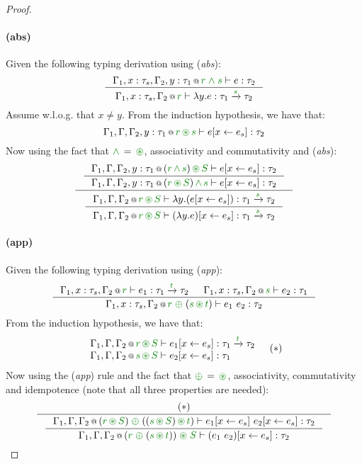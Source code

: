 \begin{proof}
\paragraph{(abs)} Given the following typing derivation using (\emph{abs}):
\[
\inference
  {\coctx{\Gamma_1,x:\tau_s,\Gamma_2, y:\tau_1}{\cclrd{r}\;\czip\;\cclrd{s}} \vdash e : \tau_2}
  {\coctx{\Gamma_1,x:\tau_s,\Gamma_2}{\cclrd{r}} \vdash \lambda y.e : \tau_1 \xrightarrow{\cclrd{s}} \tau_2 }
\]
Assume w.l.o.g. that $x\neq y$. From the induction hypothesis, we have that:
\[
\coctx{\Gamma_1,\Gamma,\Gamma_2, y:\tau_1}{ \cclrd{r} \,\cseq\, \cclrd{s} } \vdash \subst{e}{x}{e_s} : \tau_2
\]
Now using the fact that $\czip\,=\,\cseq$, associativity and commutativity and (\emph{abs}):
\[
\inference
 {\inference
  {\coctx{\Gamma_1,\Gamma,\Gamma_2, y:\tau_1}{ (\cclrd{r} \,\czip\, \cclrd{s})\,\cseq\,\cclrd{S} } \vdash \subst{e}{x}{e_s} : \tau_2}
  {\coctx{\Gamma_1,\Gamma,\Gamma_2, y:\tau_1}{ (\cclrd{r} \,\cseq\, \cclrd{S})\,\czip\,\cclrd{s} } \vdash \subst{e}{x}{e_s} : \tau_2}}
 {\inference
  {\coctx{\Gamma_1,\Gamma,\Gamma_2}{\cclrd{r} \,\cseq\, \cclrd{S}} \vdash \lambda y.(\subst{e}{x}{e_s}) : \tau_1 \xrightarrow{\cclrd{s}} \tau_2}
  {\coctx{\Gamma_1,\Gamma,\Gamma_2}{\cclrd{r} \,\cseq\, \cclrd{S}} \vdash \subst{(\lambda y.e)}{x}{e_s} : \tau_1 \xrightarrow{\cclrd{s}} \tau_2} }
\]

\paragraph{(app)} Given the following typing derivation using (\emph{app}):
\[
\inference
  {\coctx{\Gamma_1,x:\tau_s,\Gamma_2}{\cclrd{r}} \vdash e_1 : \tau_1 \xrightarrow{\cclrd{t}} \tau_2 &
   \coctx{\Gamma_1,x:\tau_s,\Gamma_2}{\cclrd{s}} \vdash e_2 : \tau_1 }
  {\coctx{\Gamma_1,x:\tau_s,\Gamma_2}{\cclrd{r} \;\cpar\; (\cclrd{s} \,\cseq\, \cclrd{t})} \vdash e_1~e_2 : \tau_2}
\]
From the induction hypothesis, we have that:
\[
\begin{array}{l}
 \coctx{\Gamma_1, \Gamma, \Gamma_2}{\cclrd{r}\,\cseq\,\cclrd{S}} \vdash \subst{e_1}{x}{e_s} : \tau_1 \xrightarrow{\cclrd{t}} \tau_2 \\
 \coctx{\Gamma_1, \Gamma, \Gamma_2}{\cclrd{s}\,\cseq\,\cclrd{S}} \vdash \subst{e_2}{x}{e_s} : \tau_1
\end{array}\quad(*)
\]
Now using the (\emph{app}) rule and the fact that $\cpar\,=\,\cseq$, associativity, commutativity and idempotence
(note that all three properties are needed):
\[
\inference
 { (*) }
 {\inference
   { \coctx{\Gamma_1,\Gamma,\Gamma_2}{(\cclrd{r}\,\cseq\,\cclrd{S}) \;\cpar\; ((\cclrd{s}\,\cseq\,\cclrd{S}) \,\cseq\, \cclrd{t})} 
       \vdash \subst{e_1}{x}{e_s}~\subst{e_2}{x}{e_s} : \tau_2}
   { \coctx{\Gamma_1,\Gamma,\Gamma_2}{(\cclrd{r} \;\cpar\; (\cclrd{s} \,\cseq\, \cclrd{t}))\;\cseq\;\cclrd{S}} 
       \vdash \subst{(e_1~e_2)}{x}{e_s} : \tau_2} }
\]


\end{proof}
